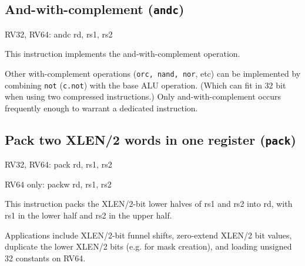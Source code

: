 


\subsection{And-with-complement (\texttt{andc})}

\begin{rvb}
  RV32, RV64:
    andc rd, rs1, rs2
\end{rvb}

This instruction implements the and-with-complement operation.



Other with-complement operations ({\tt orc, nand, nor}, etc) can be implemented
by combining {\tt not} ({\tt c.not}) with the base ALU operation. (Which can
fit in 32 bit when using two compressed instructions.) Only and-with-complement
occurs frequently enough to warrant a dedicated instruction.

%
%
%


\subsection{Pack two XLEN/2 words in one register (\texttt{pack})}

\begin{rvb}
  RV32, RV64:
    pack rd, rs1, rs2

  RV64 only:
    packw rd, rs1, rs2
\end{rvb}

This instruction packs the XLEN/2-bit lower halves of rs1 and rs2 into
rd, with rs1 in the lower half and rs2 in the upper half.



Applications include XLEN/2-bit funnel shifts, zero-extend XLEN/2 bit values, duplicate the lower
XLEN/2 bits (e.g. for mask creation), and loading unsigned 32 constants on RV64.

